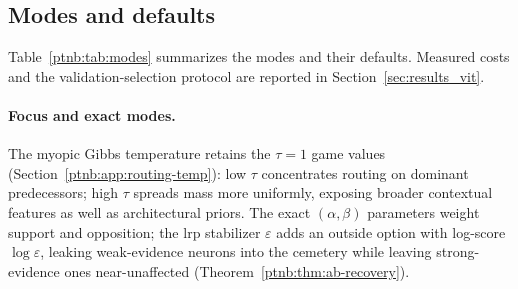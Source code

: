 \subsection{Modes and defaults}\label{ptnb:app:mode-guide}

Table~\ref{ptnb:tab:modes} summarizes the modes and their defaults. Measured costs and the validation-selection protocol are reported in Section~\ref{sec:results_vit}.

\begin{table}[t]
    \centering
    \caption[Game modes: defaults and effects]{Game modes: defaults and effects.
    ``Exact'' stays within a represented rule. $\sigma^2$ is input variance for \ac{ptnbADF}; $N$ counts averaged input transformations.}
    \label{ptnb:tab:modes}
%
\end{table}

\paragraph{Focus and exact modes.}
The myopic Gibbs temperature retains the $\tau=1$ game values (Section~\ref{ptnb:app:routing-temp}):
low $\tau$ concentrates routing on dominant predecessors; high $\tau$ spreads mass more uniformly, exposing broader contextual features as well as architectural priors. The exact $(\alpha,\beta)$ parameters weight support and opposition; the \ac{lrp} stabilizer $\varepsilon$ adds an outside option with log-score $\log\varepsilon$, leaking weak-evidence neurons into the
cemetery while leaving strong-evidence ones near-unaffected (Theorem~\ref{ptnb:thm:ab-recovery}).

